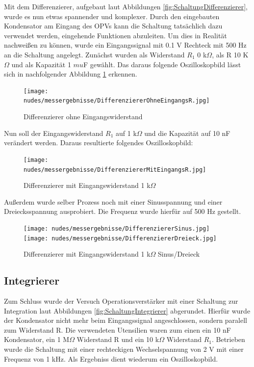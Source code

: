 \documentclass[12pt,a4paper,twoside]{article}
\begin{document}
Mit dem Differenzierer, aufgebaut laut Abbildungen \ref{fig:SchaltungDifferenzierer}, wurde es nun etwas spannender und komplexer. 
Durch den eingebauten Kondensator am Eingang des OPVs kann die Schaltung tatsächlich dazu verwendet werden, eingehende Funktionen abzuleiten. 
Um dies in Realität nachweißen zu können, wurde ein Eingangssignal mit 0.1 V Rechteck mit 500 Hz an die Schaltung angelegt. Zunächst wurden als Widerstand $R_{1}$ 0 k$\Omega$, als R 10 K$\Omega$ und als Kapazität 1 $mu$F gewählt.
Das daraus folgende Oszilloskopbild lässt sich in nachfolgender Abbildung \ref{fig:Differenzierer0R1} erkennen.

\begin{figure}[H]
    \centering
    \texttt{[image: nudes/messergebnisse/DifferenziererOhneEingangsR.jpg]}
    \caption{Differenzierer ohne Eingangswiderstand}
    \label{fig:Differenzierer0R1}
\end{figure}

\noindent
Nun soll der Eingangswiderstand $R_{1}$ auf 1 k$\Omega$ und die Kapazität auf 10 nF verändert werden. Daraus resultierte folgendes Oszilloskopbild:

\begin{figure}[H]
    \centering
    \texttt{[image: nudes/messergebnisse/DifferenziererMitEingangsR.jpg]}
    \caption{Differenzierer mit Eingangswiderstand 1 k$\Omega$}
    \label{fig:Differenzierer1R1}
\end{figure}

\noindent
Außerdem wurde selber Prozess noch mit einer Sinusspannung und einer Dreiecksspannung ausprobiert. Die Frequenz wurde hierfür auf 500 Hz gestellt.

\begin{figure}[H]
    \centering
    \texttt{[image: nudes/messergebnisse/DifferenziererSinus.jpg]}
    \texttt{[image: nudes/messergebnisse/DifferenziererDreieck.jpg]}
    \caption{Differenzierer mit Eingangswiderstand 1 k$\Omega$ Sinus/Dreieck}
    \label{fig:Differenzierer1R1}
\end{figure}


\subsection{Integrierer}
Zum Schluss wurde der Versuch Operationsverstärker mit einer Schaltung zur Integration laut Abbildungen \ref{fig:SchaltungIntegrierer} abgerundet. Hierfür wurde der Kondensator nicht mehr beim Eingangssignal angeschlossen, sondern paralell zum Widerstand R.
Die verwendeten Utensilien waren zum einen ein 10 nF Kondensator, ein 1 M$\Omega$ Widerstand R und ein 10 k$\Omega$ Widerstand $R_{1}$. Betrieben wurde die Schaltung mit einer rechteckigen Wechselspannung von 2 V mit einer Frequenz von 1 kHz. Als Ergebniss dient wiederum ein Oszilloskopbild.
\end{document}
